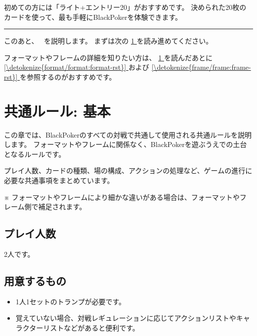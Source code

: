 \documentclass[letterpaper,10pt,dvipdfmx]{sphinxmanual}
\begin{document}
\sphinxAtStartPar
{} 初めての方には「ライト+エントリー20」がおすすめです。
決められた20枚のカードを使って、最も手軽にBlackPokerを体験できます。


\bigskip\hrule\bigskip


\sphinxAtStartPar
このあと、　 を説明します。
まずは次の \hyperref[\detokenize{common/common:common-rst}]{\ref{\detokenize{common/common:common-rst}} } を読み進めてください。

\sphinxAtStartPar
フォーマットやフレームの詳細を知りたい方は、 \hyperref[\detokenize{common/common:common-rst}]{\ref{\detokenize{common/common:common-rst}} } を読んだあとに
\hyperref[\detokenize{format/format:format-rst}]{\ref{\detokenize{format/format:format-rst}} } および \hyperref[\detokenize{frame/frame:frame-rst}]{\ref{\detokenize{frame/frame:frame-rst}} } を参照するのがおすすめです。

\sphinxstepscope


\chapter{共通ルール: 基本}
\label{\detokenize{common/common:common-rst}}\label{\detokenize{common/common:id1}}\label{\detokenize{common/common::doc}}
\sphinxAtStartPar
この章では、BlackPokerのすべての対戦で共通して使用される共通ルールを説明します。
フォーマットやフレームに関係なく、BlackPokerを遊ぶうえでの土台となるルールです。

\sphinxAtStartPar
プレイ人数、カードの種類、場の構成、アクションの処理など、ゲームの進行に必要な共通事項をまとめています。

\sphinxAtStartPar
※ フォーマットやフレームにより細かな違いがある場合は、フォーマットやフレーム側で補足されます。


\section{プレイ人数}
\label{\detokenize{common/common:id2}}
\sphinxAtStartPar
2人です。


\section{用意するもの}
\label{\detokenize{common/common:id3}}\begin{itemize}
\item {} 
\sphinxAtStartPar
1人1セットのトランプが必要です。

\item {} 
\sphinxAtStartPar
覚えていない場合、対戦レギュレーションに応じてアクションリストやキャラクターリストなどがあると便利です。

\end{itemize}
\end{document}
